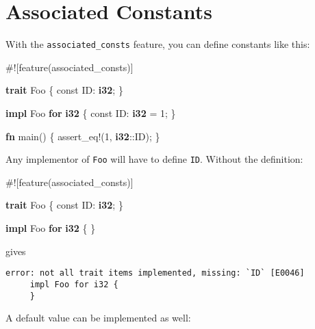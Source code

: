 \documentclass[a4paper,]{book}
\newenvironment{Shaded}{\begin{snugshade}}{\end{snugshade}}
\newcommand{\KeywordTok}[1]{\textcolor[rgb]{0.13,0.29,0.53}{\textbf{{#1}}}}
\newcommand{\DecValTok}[1]{\textcolor[rgb]{0.00,0.00,0.81}{{#1}}}
\newcommand{\OtherTok}[1]{\textcolor[rgb]{0.56,0.35,0.01}{{#1}}}
\newcommand{\NormalTok}[1]{{#1}}
\begin{document}
\section{Associated Constants}\label{sec--associated-constants}

With the \texttt{associated\_consts} feature, you can define constants
like this:

\begin{Shaded}
\begin{Highlighting}[]
\NormalTok{#![feature(associated_consts)]}

\KeywordTok{trait} \NormalTok{Foo \{}
    \NormalTok{const ID: }\KeywordTok{i32}\NormalTok{;}
\NormalTok{\}}

\KeywordTok{impl} \NormalTok{Foo }\KeywordTok{for} \KeywordTok{i32} \NormalTok{\{}
    \NormalTok{const ID: }\KeywordTok{i32} \NormalTok{= }\DecValTok{1}\NormalTok{;}
\NormalTok{\}}

\KeywordTok{fn} \NormalTok{main() \{}
    \OtherTok{assert_eq!}\NormalTok{(}\DecValTok{1}\NormalTok{, }\KeywordTok{i32}\NormalTok{::ID);}
\NormalTok{\}}
\end{Highlighting}
\end{Shaded}

Any implementor of \texttt{Foo} will have to define \texttt{ID}. Without
the definition:

\begin{Shaded}
\begin{Highlighting}[]
\NormalTok{#![feature(associated_consts)]}

\KeywordTok{trait} \NormalTok{Foo \{}
    \NormalTok{const ID: }\KeywordTok{i32}\NormalTok{;}
\NormalTok{\}}

\KeywordTok{impl} \NormalTok{Foo }\KeywordTok{for} \KeywordTok{i32} \NormalTok{\{}
\NormalTok{\}}
\end{Highlighting}
\end{Shaded}

gives

\begin{verbatim}
error: not all trait items implemented, missing: `ID` [E0046]
     impl Foo for i32 {
     }
\end{verbatim}

A default value can be implemented as well:
\end{document}
